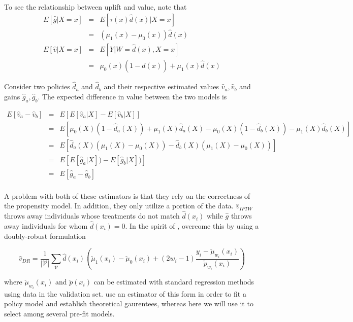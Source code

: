 To see the relationship between uplift and value, note that
\[
\begin{array}{rcl}	
	E[\hat g | X=x] & = & E[\tau(x) \hat d(x) | X=x]  \\
	& =  & (\mu_1(x)-\mu_0(x))  \hat d(x)  \\
	E[\hat v | X=x] & = & E[Y | W=\hat d(x), X=x]  \\
	& = & \mu_0(x)(1-\hat d(x)) + \mu_1(x)\hat d(x)
\end{array}
\]

Consider two policies $\hat d_a$ and $\hat d_b$ and their respective estimated values $\hat v_a, \hat v_b$  and gains $\hat g_a, \hat g_b$. The expected difference in value between the two models is 

\[
\begin{array}{rcl}
E[\hat v_a - \hat v_b] 

& = & E[E[\hat v_a | X] - E[\hat v_b|X]] \\

&=& E \left[
	\mu_0(X)(1-\hat d_a(X)) + \mu_1(X)\hat d_a(X) 
      - \mu_0(X)(1-\hat d_b(X)) -  \mu_1(X)\hat d_b(X)
\right] \\

&=& E \left[
	  \hat d_a(X) (\mu_1(X)  - \mu_0(X) ) 
	- \hat d_b(X) (\mu_1(X)  - \mu_0(X) )
\right] \\

&=& E \left[
	  E[\hat g_a | X] ) 
	- E[\hat g_b | X] )
\right] \\

&=& E \left[ \hat g_a - \hat g_b \right] \\
\end{array}
\]

A problem with both of these estimators is that they rely on the correctness of the propensity model. In addition, they only utilize a portion of the data. $\hat v_{IPTW}$ throws away individuals whose treatments do not match $\hat d(x_i)$ while $\hat g$ throws away individuals for whom $\hat d(x_i) = 0$. In the spirit of \citet{Dudik:tn}, \citet{Athey:wj} overcome this by using a doubly-robust formulation

\begin{equation}
	\hat v_{DR} = \frac{1}{|\mathcal{V}|}\sum_{\mathcal{V}}
	\hat d(x_i)
	\left(
	\check\mu_1(x_i) - \check\mu_0(x_i)+ (2w_i -1)\frac{y_i - \check\mu_{w_i}(x_i)}{\check p_{w_i}(x_i)}
	\right)
\label{value-dr}
\end{equation}

where $\check\mu_{w_i}(x_i)$ and $\check p(x_i)$ can be estimated with standard regression methods using data in the validation set. \citet{Athey:wj} use an estimator of this form in order to fit a policy model and establish theoretical gaurentees, whereas here we will use it to select among several pre-fit models.

